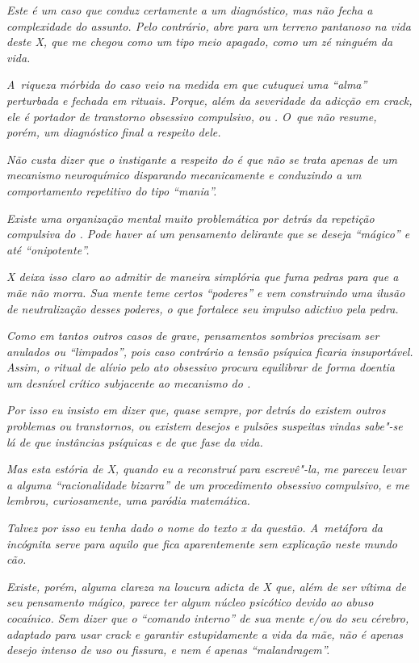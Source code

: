 \emph{Este é um caso que conduz certamente a um diagnóstico, mas não
fecha a complexidade do assunto. Pelo contrário, abre para um terreno
pantanoso na vida deste X, que me chegou como um tipo meio apagado, como
um zé ninguém da vida.}~

\emph{A~riqueza mórbida do caso veio na medida em que cutuquei uma
``alma'' perturbada e fechada em rituais. Porque, além da severidade da
adicção em crack, ele é portador de transtorno obsessivo compulsivo, ou
. O~que não resume, porém, um diagnóstico final a respeito dele.}~

\emph{Não custa dizer que o instigante a respeito do  é que não se
trata apenas de um mecanismo neuroquímico disparando mecanicamente e
conduzindo a um comportamento repetitivo do tipo ``mania''.}~

\emph{Existe uma organização mental muito problemática por detrás da
repetição compulsiva do . Pode haver aí um pensamento delirante que
se deseja ``mágico'' e até ``onipotente''.}

\emph{X deixa isso claro ao admitir de maneira simplória que fuma pedras
para que a mãe não morra. Sua mente teme certos ``poderes'' e vem
construindo uma ilusão de neutralização desses poderes, o que fortalece
seu impulso adictivo pela pedra.}~

\emph{Como em tantos outros casos de  grave, pensamentos sombrios
precisam ser anulados ou ``limpados'', pois caso contrário a tensão
psíquica ficaria insuportável. Assim, o ritual de alívio pelo ato
obsessivo procura equilibrar de forma doentia um desnível crítico
subjacente ao mecanismo do .}~

\emph{Por isso eu insisto em dizer que, quase sempre, por detrás do 
existem outros problemas ou transtornos, ou existem desejos e pulsões
suspeitas vindas sabe"-se lá de que instâncias psíquicas e de que fase da
vida.}~

\emph{Mas esta estória de X, quando eu a reconstruí para escrevê"-la, me
pareceu levar a alguma ``racionalidade bizarra'' de um procedimento
obsessivo compulsivo, e me lembrou, curiosamente, uma paródia
matemática.}~

\emph{Talvez por isso eu tenha dado o nome do texto x da questão. A~metáfora da incógnita serve para aquilo que fica aparentemente sem
explicação neste mundo cão.}~

\emph{Existe, porém, alguma clareza na loucura adicta de X que, além de
ser vítima de seu pensamento mágico, parece ter algum núcleo psicótico
devido ao abuso cocaínico. Sem dizer que o ``comando interno'' de sua
mente e/ou do seu cérebro, adaptado para usar crack e garantir
estupidamente a vida da mãe, não é apenas desejo intenso de uso ou
fissura, e nem é apenas ``malandragem''.}~

